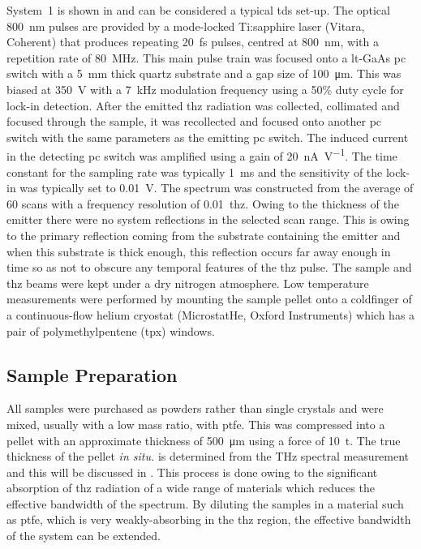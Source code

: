 System~1 is shown in  and can be considered a typical \acrshort{tds} set\nobreakdash-up. The optical \SI{800}{nm} pulses are provided by a mode-locked Ti:sapphire laser (Vitara, Coherent) that produces repeating \SI{20}{fs} pulses, centred at \SI{800}{nm}, with a repetition rate of \SI{80}{MHz}. This main pulse train was focused onto a \acrshort{lt}\nobreakdash-GaAs \acrshort{pc} switch with a \SI{5}{mm} thick quartz substrate and a gap size of \SI{100}{\micro\metre}. This was biased at \SI{350}{V} with a \SI{7}{kHz} modulation frequency using a 50\% duty cycle for lock-in detection. After the emitted \acrshort{thz} radiation was collected, collimated and focused through the sample, it was recollected and focused onto another \acrshort{pc} switch with the same parameters as the emitting \acrshort{pc} switch. The induced current in the detecting \acrshort{pc} switch was amplified using a gain of \SI{20}{\unit{\nA.\V^{-1}}}. The time constant for the sampling rate was typically \SI{1}{ms} and the sensitivity of the lock\nobreakdash-in was typically set to \SI{0.01}{V}. The spectrum was constructed from the average of 60 scans with a frequency resolution of \SI{0.01}{\acrshort{thz}}. Owing to the thickness of the emitter there were no system reflections in the selected scan range. This is owing to the primary reflection coming from the substrate containing the emitter and when this substrate is thick enough, this reflection occurs far away enough in time so as not to obscure any temporal features of the \acrshort{thz} pulse. The sample and \acrshort{thz} beams were kept under a dry nitrogen atmosphere. Low temperature measurements were performed by mounting the sample pellet onto a coldfinger of a continuous\nobreakdash-flow helium cryostat (MicrostatHe, Oxford Instruments) which has a pair of polymethylpentene (\acrshort{tpx}) windows.

\subsection{Sample Preparation}
All samples were purchased as powders rather than single crystals and were mixed, usually with a low mass ratio, with \acrfull{ptfe}. This was compressed into a pellet with an approximate thickness of \SI{500}{\micro\metre} using a force of \SI{10}{\tonne}. The true thickness of the pellet \textit{in situ.} is determined from the THz spectral measurement and this will be discussed in . This process is done owing to the significant absorption of \acrshort{thz} radiation of a wide range of materials which reduces the effective bandwidth of the spectrum. By diluting the samples in a material such as \acrshort{ptfe}, which is very weakly\nobreakdash-absorbing in the \acrshort{thz} region, the effective bandwidth of the system can be extended. 

